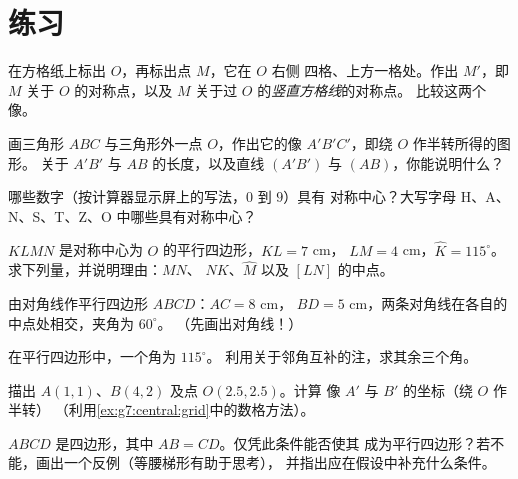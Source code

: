 \section{练习}

\begin{exercise}[$\star$]\label{exo:g7:central:1}
在方格纸上标出 $O$，再标出点 $M$，它在 $O$ 右侧
四格、上方一格处。作出 $M'$，即 $M$ 关于 $O$ 的对称点，以及
$M$ 关于过 $O$ 的\emph{竖直方格线}的对称点。
比较这两个像。
\end{exercise}

\begin{exercise}[$\star$]\label{exo:g7:central:2}
画三角形 $ABC$ 与三角形外一点 $O$，作出它的像
$A'B'C'$，即绕 $O$ 作半转所得的图形。
关于 $A'B'$ 与 $AB$ 的长度，以及直线 $(A'B')$ 与 $(AB)$，你能说明什么？
\end{exercise}

\begin{exercise}[$\star$]\label{exo:g7:central:3}
哪些数字（按计算器显示屏上的写法，$0$ 到 $9$）具有
对称中心？大写字母 H、A、N、S、T、Z、O 中哪些具有对称中心？
\end{exercise}

\begin{exercise}[$\star$]\label{exo:g7:central:4}
$KLMN$ 是对称中心为 $O$ 的平行四边形，$KL = 7$ cm，
$LM = 4$ cm，$\widehat K = 115^\circ$。求下列量，并说明理由：$MN$、
$NK$、$\widehat M$ 以及 $[LN]$ 的中点。
\end{exercise}

\begin{exercise}[$\star$]\label{exo:g7:central:5}
由对角线作平行四边形 $ABCD$：$AC = 8$ cm，
$BD = 5$ cm，两条对角线在各自的中点处相交，夹角为 $60^\circ$。
（先画出对角线！）
\end{exercise}

\begin{exercise}[$\star$]\label{exo:g7:central:6}
在平行四边形中，一个角为 $115^\circ$。
利用关于邻角互补的注，求其余三个角。
\end{exercise}

\begin{exercise}[$\star\star$]\label{exo:g7:central:7}
描出 $A(1, 1)$、$B(4, 2)$ 及点 $O(2.5, 2.5)$。计算
像 $A'$ 与 $B'$ 的坐标（绕 $O$ 作半转）
（利用\cref{ex:g7:central:grid}中的数格方法）。
\end{exercise}

\begin{exercise}[$\star\star$]\label{exo:g7:central:8}
$ABCD$ 是四边形，其中 $AB = CD$。仅凭此条件能否使其
成为平行四边形？若不能，画出一个反例（等腰梯形有助于思考），
并指出应在假设中补充什么条件。
\end{exercise}

